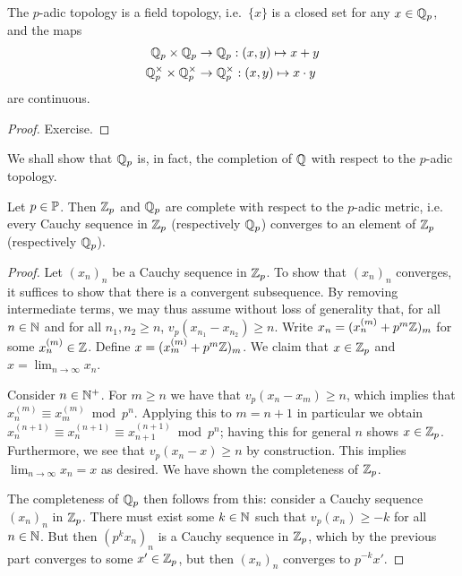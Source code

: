 \documentclass[12pt, leqno, british]{amsart}
\begin{document}
\begin{prop}\label{P:field-topology}
The $p$-adic topology is a field topology, i.e.~$\lbrace x \rbrace$ is a closed set for any $x \in \mathbb Q_p$, and the maps
\begin{align*}
\mathbb Q_p \times \mathbb Q_p &\to \mathbb Q_p : (x, y) \mapsto x+y \\
\mathbb Q_p^{\times} \times \mathbb Q_p^{\times} &\to \mathbb Q_p^{\times} : (x, y) \mapsto x \cdot y
\end{align*}
are continuous.
\end{prop}
\begin{proof}
Exercise.
\end{proof}
We shall show that $\mathbb Q_p$ is, in fact, the completion of $\mathbb Q$ with respect to the $p$-adic topology.
%
\begin{thm}\label{T:Qp-complete}
Let $p \in \mathbb P$.
Then $\mathbb Z_p$ and $\mathbb Q_p$ are complete with respect to the $p$-adic metric, i.e. every Cauchy sequence in $\mathbb Z_p$ (respectively $\mathbb Q_p$) converges to an element of $\mathbb Z_p$ (respectively $\mathbb Q_p$).
\end{thm}
\begin{proof}
Let $(x_n)_n$ be a Cauchy sequence in $\mathbb Z_p$.
To show that $(x_n)_n$ converges, it suffices to show that there is a convergent subsequence.
By removing intermediate terms, we may thus assume without loss of generality that, for all $n\in\mathbb N$ and for all $n_1, n_2 \geq n$, $v_p(x_{n_1} - x_{n_2}) \geq n$.
Write $x_n = (x_n^{(m)} + p^m\mathbb Z)_{m}$ for some $x_n^{(m)} \in \mathbb Z$.
Define $x = (x_m^{(m)} + p^m\mathbb Z)_{m}$.
We claim that $x \in \mathbb Z_p$ and $x = \lim_{n \to \infty} x_n$.

Consider $n \in \mathbb N^+$.
For $m \geq n$ we have that $v_p(x_n - x_m) \geq n$, which implies that $x_n^{(m)} \equiv x_m^{(m)} \bmod p^n$.
Applying this to $m = n+1$ in particular we obtain $x_{n}^{(n+1)} \equiv x_{n}^{(n+1)} \equiv x_{n+1}^{(n+1)} \bmod p^n$; having this for general $n$ shows $x \in \mathbb Z_p$.
Furthermore, we see that $v_p(x_n - x) \geq n$ by construction.
This implies $\lim_{n \to \infty} x_n = x$ as desired.
We have shown the completeness of $\mathbb Z_p$.

The completeness of $\mathbb Q_p$ then follows from this: consider a Cauchy sequence $(x_n)_n$ in $\mathbb Z_p$.
There must exist some $k \in \mathbb N$ such that $v_p(x_n) \geq -k$ for all $n \in \mathbb N$.
But then $(p^kx_n)_n$ is a Cauchy sequence in $\mathbb Z_p$, which by the previous part converges to some $x' \in \mathbb Z_p$, but then $(x_n)_n$ converges to $p^{-k}x'$.
\end{proof}
\end{document}
